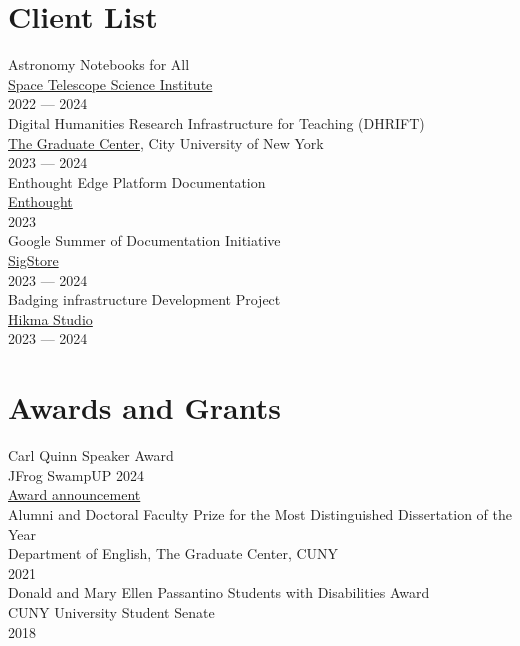 \documentclass[11pt]{article}
\begin{document}
\section*{Client List}
\label{sec:org553ed1c}
Astronomy Notebooks for All\\[0pt]
\href{https://www.stsci.edu/}{Space Telescope Science Institute}\\[0pt]
2022 — 2024\\[0pt]

Digital Humanities Research Infrastructure for Teaching (DHRIFT)\\[0pt]
\href{https://www.gc.cuny.edu/}{The Graduate Center}, City University of New York\\[0pt]
2023 — 2024\\[0pt]

Enthought Edge Platform Documentation\\[0pt]
\href{https://www.enthought.com/}{Enthought}\\[0pt]
2023\\[0pt]

Google Summer of Documentation Initiative\\[0pt]
\href{https://www.sigstore.dev/}{SigStore}\\[0pt]
2023 — 2024\\[0pt]

Badging infrastructure Development Project\\[0pt]
\href{https://www.hikma.studio/}{Hikma Studio}\\[0pt]
2023 — 2024\\[0pt]

\section*{Awards and Grants}
\label{sec:org0f1b72a}
Carl Quinn Speaker Award\\[0pt]
JFrog SwampUP 2024\\[0pt]
\href{https://www.linkedin.com/posts/jfrog-ltd\_swampup-activity-7240130790234169344-k2--}{Award announcement}\\[0pt]

Alumni and Doctoral Faculty Prize for the Most Distinguished Dissertation of the Year\\[0pt]
Department of English, The Graduate Center, CUNY\\[0pt]
2021\\[0pt]

Donald and Mary Ellen Passantino Students with Disabilities Award\\[0pt]
CUNY University Student Senate\\[0pt]
2018\\[0pt]
\end{document}
